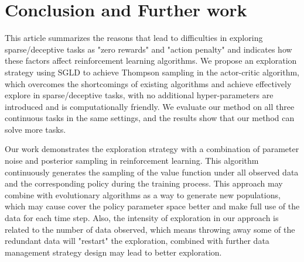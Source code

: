 \section{Conclusion and Further work}
This article summarizes the reasons that lead to difficulties in exploring sparse/deceptive tasks as "zero rewards" and "action penalty" and indicates how these factors affect reinforcement learning algorithms. We propose an exploration strategy using SGLD to achieve Thompson sampling in the actor-critic algorithm, which overcomes the shortcomings of existing algorithms and achieve effectively explore in sparse/deceptive tasks, with no additional hyper-parameters are introduced and is computationally friendly. We evaluate our method on all three continuous tasks in the same settings, and the results show that our method can solve more tasks.

Our work demonstrates the exploration strategy with a combination of parameter noise and posterior sampling in reinforcement learning. This algorithm continuously generates the sampling of the value function under all observed data and the corresponding policy during the training process. This approach may combine with evolutionary algorithms as a way to generate new populations, which may cause cover the policy parameter space better and make full use of the data for each time step. Also, the intensity of exploration in our approach is related to the number of data observed, which means throwing away some of the redundant data will "restart" the exploration, combined with further data management strategy design may lead to better exploration.